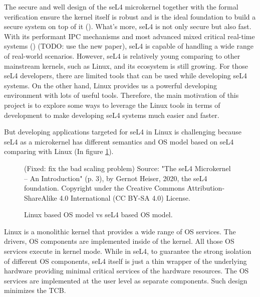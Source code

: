 The secure and well design of the seL4 microkernel together with the formal verification ensure the kernel itself is robust and is the ideal foundation to build a secure system on top of it (\cite{Klein_AEHCDEEKNSTW_10}). What's more, seL4 is not only secure but also fast. With its performant IPC mechanisms and most advanced mixed critical real-time systems (\cite{Lyons_Heiser_14}) (TODO: use the new paper), seL4 is capable of handling a wide range of real-world scenarios. However, seL4 is relatively young comparing to other mainstream kernels, such as Linux, and its ecosystem is still growing. For those seL4 developers, there are limited tools that can be used while developing seL4 systems. On the other hand, Linux provides us a powerful developing environment with lots of useful tools. Therefore, the main motivation of this project is to explore some ways to leverage the Linux tools in terms of development to make developing seL4 systems much easier and faster.

But developing applications targeted for seL4 in Linux is challenging because seL4 as a microkernel has different semantics and OS model based on seL4 comparing with Linux (In figure \ref{fig:osmodel}).

\begin{figure}[h] (Fixed: fix the bad scaling problem)
    \centering
    {Source: "The seL4 Microkernel – An Introduction" (p. 3), by Gernot Heiser, 2020, the seL4 foundation. Copyright  under the Creative Commons Attribution-ShareAlike 4.0 International (CC BY-SA 4.0) License.}
    
    \caption{Linux based OS model vs seL4 based OS model.}
    \label{fig:osmodel}
\end{figure}

Linux is a monolithic kernel that provides a wide range of OS services. The drivers, OS components are implemented inside of the kernel. All those OS services execute in kernel mode. While in seL4, to guarantee the strong isolation of different OS components, seL4 itself is just a thin wrapper of the underlying hardware providing minimal critical services of the hardware resources. The OS services are implemented at the user level as separate components. Such design minimizes the TCB. 

